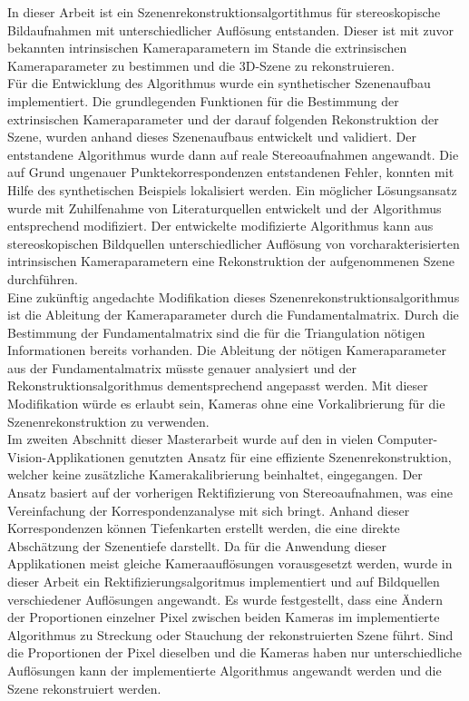 
In dieser Arbeit ist ein Szenenrekonstruktionsalgortithmus für stereoskopische Bildaufnahmen mit unterschiedlicher Auflösung entstanden. Dieser ist mit zuvor bekannten intrinsischen Kameraparametern im Stande die extrinsischen Kameraparameter zu bestimmen und die 3D-Szene zu rekonstruieren. \\

Für die Entwicklung des Algorithmus wurde ein synthetischer Szenenaufbau implementiert. Die grundlegenden Funktionen für die Bestimmung der extrinsischen Kameraparameter und der darauf folgenden Rekonstruktion der Szene, wurden anhand dieses Szenenaufbaus entwickelt und validiert. Der entstandene Algorithmus wurde dann auf reale Stereoaufnahmen angewandt. Die auf Grund ungenauer Punktekorrespondenzen entstandenen Fehler, konnten mit Hilfe des synthetischen Beispiels lokalisiert werden. Ein möglicher Lösungsansatz wurde mit Zuhilfenahme von Literaturquellen entwickelt und der Algorithmus entsprechend modifiziert. Der entwickelte modifizierte Algorithmus kann aus stereoskopischen Bildquellen unterschiedlicher Auflösung von vorcharakterisierten intrinsischen Kameraparametern eine Rekonstruktion der aufgenommenen Szene durchführen.  \\

Eine zukünftig angedachte Modifikation dieses Szenenrekonstruktionsalgorithmus ist die Ableitung der Kameraparameter durch die Fundamentalmatrix. Durch die Bestimmung der Fundamentalmatrix sind die für die Triangulation nötigen Informationen bereits vorhanden. Die Ableitung der nötigen Kameraparameter aus der Fundamentalmatrix müsste genauer analysiert und der Rekonstruktionsalgorithmus dementsprechend angepasst werden. Mit dieser Modifikation würde es erlaubt sein, Kameras ohne eine Vorkalibrierung für die Szenenrekonstruktion zu verwenden. \\

Im zweiten Abschnitt dieser Masterarbeit wurde auf den in vielen Computer-Vision-Applikationen genutzten Ansatz für eine effiziente Szenenrekonstruktion, welcher keine zusätzliche Kamerakalibrierung beinhaltet, eingegangen. Der Ansatz basiert auf der vorherigen Rektifizierung von Stereoaufnahmen, was eine Vereinfachung der Korrespondenzanalyse mit sich bringt. Anhand dieser Korrespondenzen können Tiefenkarten erstellt werden, die eine direkte Abschätzung der Szenentiefe darstellt. Da für die Anwendung dieser Applikationen meist gleiche Kameraauflösungen vorausgesetzt werden, wurde in dieser Arbeit ein Rektifizierungsalgoritmus implementiert und auf Bildquellen verschiedener Auflösungen angewandt. Es wurde festgestellt, dass eine Ändern der Proportionen einzelner Pixel zwischen beiden Kameras im implementierte Algorithmus zu Streckung oder Stauchung der rekonstruierten Szene führt. Sind die Proportionen der Pixel dieselben und die Kameras haben nur unterschiedliche Auflösungen kann der implementierte Algorithmus angewandt werden und die Szene rekonstruiert werden. \\

